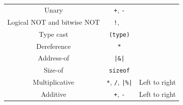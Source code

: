 \documentclass[a4paper]{report}
\begin{document}
\begin{table}[H]
\begin{tabular}{c c c}
        Unary                         & \texttt{+}, \texttt{-}                                                                                                                                                                                      &                                \\
        Logical NOT and bitwise NOT   & \texttt{!}, \texttt{~}                                                                                                                                                                                      &                                \\
        Type cast                     & \texttt{(type)}                                                                                                                                                                                                    &                                \\
        Dereference                   & \texttt{*}                                                                                                                                                                                                         &                                \\
        Address-of                    & \texttt{|\&|}                                                                                                                                                                                     &                                \\
        Size-of                       & \texttt{sizeof}                                                                                                                                                                                                    &                                \\
        \midrule
        Multiplicative                & \texttt{*}, \texttt{/}, \texttt{|\%|}                                                                                                                                               & Left to right                  \\
        Additive                      & \texttt{+}, \texttt{-}                                                                                                                                                                                      & Left to right                  \\

\end{tabular}
\end{table}
\end{document}
